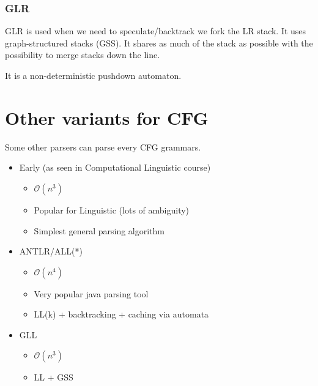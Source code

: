         \subsubsection{GLR}
            GLR is used when we need to speculate/backtrack we fork the LR
            stack. It uses graph-structured stacks (GSS). It shares as much of
            the stack as possible with the possibility to merge stacks down the
            line. 

            It is a non-deterministic pushdown automaton.
\section{Other variants for CFG}
    Some other parsers can parse every CFG grammars.
    \begin{itemize}
        \item Early (as seen in Computational Linguistic course)
        \begin{itemize}
            \item $\mathcal{O}(n^3)$
            \item Popular for Linguistic (lots of ambiguity)
            \item Simplest general parsing algorithm
        \end{itemize}
        \item ANTLR/ALL(*)
        \begin{itemize}
            \item $\mathcal{O}(n^4)$
            \item Very popular java parsing tool
            \item LL(k) + backtracking + caching via automata
        \end{itemize}
        \item GLL
        \begin{itemize}
            \item $\mathcal{O}(n^3)$
            \item LL + GSS
        \end{itemize}
    \end{itemize}